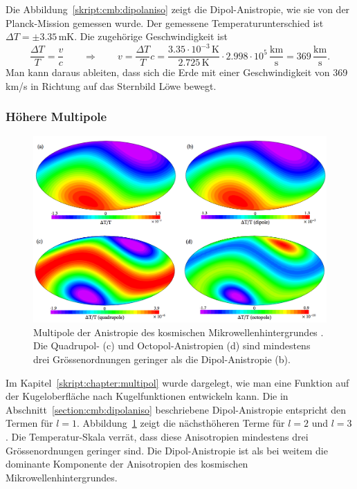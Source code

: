 Die Abbildung~\ref{skript:cmb:dipolaniso} zeigt die Dipol-Anistropie, wie
sie von der Planck-Mission gemessen wurde.
%
Der gemessene Temperaturunterschied ist $\Delta T= \pm 3.35\,\text{mK}$.
Die zugehörige Geschwindigkeit ist
\[
\frac{\Delta T}{T}=\frac{v}{c}
\qquad\Rightarrow\qquad
v=
\frac{\Delta T}{T}c
=
\frac{3.35\cdot 10^{-3}\,\text{K}}{2.725\,\text{K}}\cdot 2.998\cdot 10^{5}\,\frac{\text{km}}{\text{s}}
=
369\,\frac{\text{km}}{\text{s}}.
\]
Man kann daraus ableiten, dass sich die Erde mit einer Geschwindigkeit von
369\,km/s in Richtung auf das Sternbild Löwe bewegt.

\subsubsection{Höhere Multipole}
\begin{figure}
\centering
\includegraphics[width=\hsize]{chapters/images/cmb-multipoles.png}
\caption{Multipole der Anistropie des kosmischen Mikrowellenhintergrundes
\cite{skript:cmbmultipoles}.
Die Quadrupol- (c) und Octopol-Anistropien (d) sind mindestens drei
Grössenordnungen geringer als die Dipol-Anistropie (b).
\label{skript:cmb:multipolaniso}}
\end{figure}
Im Kapitel~\ref{skript:chapter:multipol} wurde dargelegt, wie man eine
Funktion auf der Kugeloberfläche nach Kugelfunktionen entwickeln kann.
Die in Abschnitt~\ref{section:cmb:dipolaniso} beschriebene Dipol-Anistropie
entspricht den Termen für $l=1$.
Abbildung~\ref{skript:cmb:multipolaniso} zeigt die nächsthöheren Terme für
$l=2$ und $l=3$ \cite{cmbmultipoles}.
Die Temperatur-Skala verrät, dass diese Anisotropien mindestens drei
Grössenordnungen geringer sind.
Die Dipol-Anistropie ist als bei weitem die dominante Komponente der
Anisotropien des kosmischen Mikrowellenhintergrundes.

